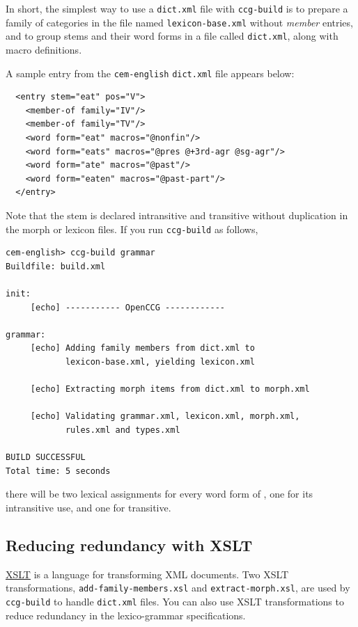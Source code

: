 \documentclass[11pt]{article}
\begin{document}
In short, the simplest way to use a \texttt{dict.xml} file with
\texttt{ccg-build} is to prepare a family of categories in the file
named \texttt{lexicon-base.xml} without \textsl{member} entries, and to
group stems and their word forms in a file called \texttt{dict.xml},
along with macro definitions.

A sample entry from the \texttt{cem-english} \texttt{dict.xml} 
file appears below:

\begin{verbatim}
  <entry stem="eat" pos="V">
    <member-of family="IV"/>
    <member-of family="TV"/>
    <word form="eat" macros="@nonfin"/>
    <word form="eats" macros="@pres @+3rd-agr @sg-agr"/>
    <word form="ate" macros="@past"/>
    <word form="eaten" macros="@past-part"/>
  </entry>
\end{verbatim}

\noindent Note that the stem  is declared intransitive and
transitive without duplication in the morph or lexicon files. If you run
\texttt{ccg-build} as follows,

\begin{verbatim}
cem-english> ccg-build grammar
Buildfile: build.xml

init:
     [echo] ----------- OpenCCG ------------

grammar:
     [echo] Adding family members from dict.xml to 
            lexicon-base.xml, yielding lexicon.xml

     [echo] Extracting morph items from dict.xml to morph.xml

     [echo] Validating grammar.xml, lexicon.xml, morph.xml, 
            rules.xml and types.xml

BUILD SUCCESSFUL
Total time: 5 seconds
\end{verbatim}

\noindent there will be two lexical assignments for every word form of
, one for its intransitive use, and one for transitive.

\subsection{Reducing redundancy with XSLT}

\href{http://www.w3.org/Style/XSL/}{XSLT} is a language for transforming
XML documents. Two XSLT transformations, \texttt{add-family-members.xsl}
and \texttt{extract-morph.xsl}, are used by \texttt{ccg-build} to handle
\texttt{dict.xml} files. You can also use XSLT transformations to reduce
redundancy in the lexico-grammar specifications.
\end{document}
